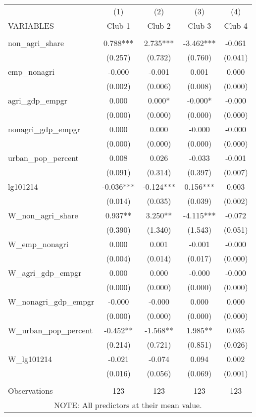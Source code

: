 \begin{tabular}{lcccc} \hline
 & (1) & (2) & (3) & (4) \\
VARIABLES & Club 1 & Club 2 & Club 3 & Club 4 \\ \hline
 &  &  &  &  \\
non\_agri\_share & 0.788*** & 2.735*** & -3.462*** & -0.061 \\
 & (0.257) & (0.732) & (0.760) & (0.041) \\
emp\_nonagri & -0.000 & -0.001 & 0.001 & 0.000 \\
 & (0.002) & (0.006) & (0.008) & (0.000) \\
agri\_gdp\_empgr & 0.000 & 0.000* & -0.000* & -0.000 \\
 & (0.000) & (0.000) & (0.000) & (0.000) \\
nonagri\_gdp\_empgr & 0.000 & 0.000 & -0.000 & -0.000 \\
 & (0.000) & (0.000) & (0.000) & (0.000) \\
urban\_pop\_percent & 0.008 & 0.026 & -0.033 & -0.001 \\
 & (0.091) & (0.314) & (0.397) & (0.007) \\
lg101214 & -0.036*** & -0.124*** & 0.156*** & 0.003 \\
 & (0.014) & (0.035) & (0.039) & (0.002) \\
W\_non\_agri\_share & 0.937** & 3.250** & -4.115*** & -0.072 \\
 & (0.390) & (1.340) & (1.543) & (0.051) \\
W\_emp\_nonagri & 0.000 & 0.001 & -0.001 & -0.000 \\
 & (0.004) & (0.014) & (0.017) & (0.000) \\
W\_agri\_gdp\_empgr & 0.000 & 0.000 & -0.000 & -0.000 \\
 & (0.000) & (0.000) & (0.000) & (0.000) \\
W\_nonagri\_gdp\_empgr & -0.000 & -0.000 & 0.000 & 0.000 \\
 & (0.000) & (0.000) & (0.000) & (0.000) \\
W\_urban\_pop\_percent & -0.452** & -1.568** & 1.985** & 0.035 \\
 & (0.214) & (0.721) & (0.851) & (0.026) \\
W\_lg101214 & -0.021 & -0.074 & 0.094 & 0.002 \\
 & (0.016) & (0.056) & (0.069) & (0.001) \\
 &  &  &  &  \\
 Observations & 123 & 123 & 123 & 123 \\ \hline
\multicolumn{5}{c}{ NOTE: All predictors at their mean value.} \\
\end{tabular}
